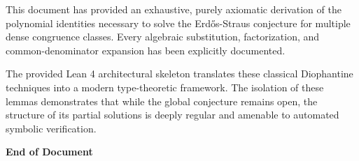 \documentclass[12pt,a4paper]{article}
\begin{document}
This document has provided an exhaustive, purely axiomatic derivation of the polynomial identities necessary to solve the Erd\H{o}s-Straus conjecture for multiple dense congruence classes. Every algebraic substitution, factorization, and common-denominator expansion has been explicitly documented.

The provided Lean 4 architectural skeleton translates these classical Diophantine techniques into a modern type-theoretic framework. The isolation of these lemmas demonstrates that while the global conjecture remains open, the structure of its partial solutions is deeply regular and amenable to automated symbolic verification.

\vspace{2cm}
\begin{center}
\textbf{End of Document}
\end{center}
\end{document}
